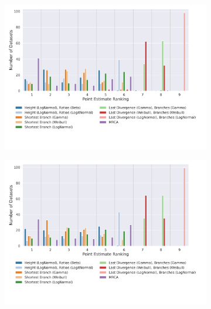 \documentclass[10pt,letterpaper]{article}
\begin{document}
\begin{figure}
	\caption{How often each method ranked at a certain position when its point estimate is compared to the other methods. For example, MRCA ranked first for the majority of datasets. (The lower the rank the better.)}
	
	\centering
	\begin{subfigure}[b]{0.45\textwidth}
		\centering
		\includegraphics[width=\textwidth]{figures/yule-100-ccd1-point-estimates-ranking.png}
	\end{subfigure}
	\begin{subfigure}[b]{0.45\textwidth}
		\centering
		\includegraphics[width=\textwidth]{figures/yule-200-ccd1-point-estimates-ranking.png}
	\end{subfigure}
	

\end{figure}
\end{document}
